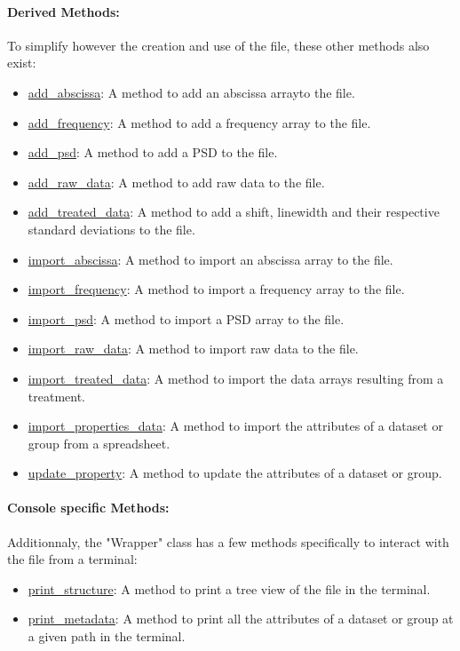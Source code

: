 \paragraph{Derived Methods:} 
To simplify however the creation and use of the file, these other methods also exist:
\begin{itemize}
    \item \hyperref[subsec:wrapper.add_abscissa]{add\_abscissa}: A method to add an abscissa arrayto the file.
    \item \hyperref[subsec:wrapper.add_frequency]{add\_frequency}: A method to add a frequency array to the file.
    \item \hyperref[subsec:wrapper.add_psd]{add\_psd}: A method to add a PSD to the file.
    \item \hyperref[subsec:wrapper.add_raw_data]{add\_raw\_data}: A method to add raw data to the file.
    \item \hyperref[subsec:wrapper.add_treated_data]{add\_treated\_data}: A method to add a shift, linewidth and their respective standard deviations to the file.
    \item \hyperref[subsec:wrapper.import_abscissa]{import\_abscissa}: A method to import an abscissa array to the file.
    \item \hyperref[subsec:wrapper.import_frequency]{import\_frequency}: A method to import a frequency array to the file.
    \item \hyperref[subsec:wrapper.import_psd]{import\_psd}: A method to import a PSD array to the file.
    \item \hyperref[subsec:wrapper.import_raw_data]{import\_raw\_data}: A method to import raw data to the file.
    \item \hyperref[subsec:wrapper.import_treated_data]{import\_treated\_data}: A method to import the data arrays resulting from a treatment.
    \item \hyperref[subsec:wrapper.import_properties_data]{import\_properties\_data}: A method to import the attributes of a dataset or group from a spreadsheet.
    \item \hyperref[subsec:wrapper.update_property]{update\_property}: A method to update the attributes of a dataset or group.
\end{itemize}

\paragraph{Console specific Methods:} 
Additionnaly, the "Wrapper" class has a few methods specifically to interact with the file from a terminal:
\begin{itemize}
    \item \hyperref[subsec:wrapper.print_structure]{print\_structure}: A method to print a tree view of the file in the terminal.
    \item \hyperref[subsec:wrapper.print_metadata]{print\_metadata}: A method to print all the attributes of a dataset or group at a given path in the terminal.
\end{itemize}

